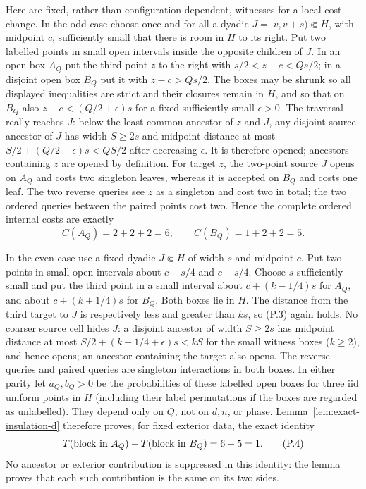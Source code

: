 \documentclass[11pt]{article}
\numberwithin{equation}{section}
\newcommand{\1}{\mathbf 1}\newcommand{\F}{\mathcal F}\newcommand{\D}{\mathcal D}
\begin{document}
Here are fixed, rather than configuration-dependent, witnesses for a local
cost change.  In the odd case choose once and for all a dyadic
$J=[v,v+s)\Subset H$, with midpoint $c$, sufficiently small that there is
room in $H$ to its right.  Put two labelled points in small open intervals
inside the opposite children of $J$.  In an open box $A_Q$ put the third
point $z$ to the right with
$s/2<z-c<Qs/2$; in a disjoint open box $B_Q$ put it with
$z-c>Qs/2$.  The boxes may be shrunk so all displayed inequalities are
strict and their closures remain in $H$, and so that on $B_Q$ also
$z-c<(Q/2+\epsilon)s$ for a fixed sufficiently small $\epsilon>0$.
The traversal really reaches $J$: below the least common ancestor of $z$
and $J$, any disjoint source ancestor of $J$ has width $S\ge2s$ and midpoint
distance at most $S/2+(Q/2+\epsilon)s<QS/2$ after decreasing $\epsilon$.
It is therefore opened; ancestors containing $z$ are opened by definition.
For target $z$, the two-point source $J$ opens on $A_Q$ and costs two
singleton leaves, whereas it is
accepted on $B_Q$ and costs one leaf.  The two reverse queries see $z$ as a
singleton and cost two in total; the two ordered queries between the paired
points cost two.  Hence the complete ordered internal costs are exactly
\[
 C(A_Q)=2+2+2=6,\qquad C(B_Q)=1+2+2=5.                 \tag{P.3}
\]

In the even case use a fixed dyadic $J\Subset H$ of width $s$ and midpoint
$c$.  Put two points in small open intervals about $c-s/4$ and $c+s/4$.
Choose $s$ sufficiently small and put the third point in a small interval
about $c+(k-1/4)s$ for $A_Q$, and about $c+(k+1/4)s$ for $B_Q$.
Both boxes lie in $H$.  The distance from the third target to $J$ is
respectively less and greater than $ks$, so (P.3) again holds.  No coarser
source cell hides $J$: a disjoint ancestor of width $S\ge2s$ has midpoint
distance at most $S/2+(k+1/4+\epsilon)s<kS$ for the small witness boxes
($k\ge2$), and hence opens; an ancestor containing the target also opens.
The reverse
queries and paired queries are singleton interactions in both boxes.
In either parity let $a_Q,b_Q>0$ be the probabilities of these labelled open
boxes for three iid uniform points in $H$ (including their label
permutations if the boxes are regarded as unlabelled).  They depend only on
$Q$, not on $d,n$, or phase.  Lemma~\ref{lem:exact-insulation-d} therefore
proves, for fixed exterior data, the exact identity
\[
 T(\hbox{block in }A_Q)-T(\hbox{block in }B_Q)=6-5=1. \tag{P.4}
\]
No ancestor or exterior contribution is suppressed in this identity: the
lemma proves that each such contribution is the same on its two sides.
\end{document}

